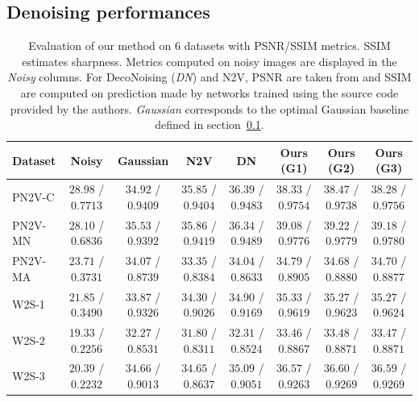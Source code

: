 \documentclass{article}
\begin{document}
\subsection{Denoising performances}
\label{sec:perf}
\begin{table}[t]
\caption{Evaluation of our method on 6 datasets with PSNR/SSIM metrics. SSIM estimates sharpness. Metrics computed on noisy images are displayed in the \textit{Noisy} columns. For DecoNoising (\textit{DN}) and N2V, PSNR are taken from \cite{goncharova2020} and SSIM are computed on prediction made by networks trained using the source code provided by the authors\protect\footnotemark. \textit{Gaussian} corresponds to the optimal Gaussian baseline defined in section~\ref{sec:perf}.}
\label{table:results}
\vskip -0.15in
\begin{center}
\begin{small}
\begin{sc}
\begin{tabular}{l@{\hskip 7.5pt}c@{\hskip 7.5pt}c@{\hskip 7.5pt}c@{\hskip 7.5pt}c@{\hskip 7.5pt}c@{\hskip 7.5pt}c@{\hskip 7.5pt}c}
\toprule
Dataset & Noisy & Gaussian & N2V & DN & Ours (G1) & Ours (G2) & Ours (G3) \\
\midrule
PN2V-C & $28.98$ / $0.7713$ & $34.92$ / $0.9409$ & $35.85$ / $0.9404$ & $36.39$ / $0.9483$ & $38.33$ / $0.9754$ & $38.47$ / $0.9738$ & $38.28$ / $0.9756$ \\
PN2V-MN & $28.10$ / $0.6836$ & $35.53$ / $0.9392$ & $35.86$ / $0.9419$ & $36.34$ / $0.9489$ & $39.08$ / $0.9776$ & $39.22$ / $0.9779$ & $39.18$ / $0.9780$ \\
PN2V-MA & $23.71$ / $0.3731$ & $34.07$ / $0.8739$ & $33.35$ / $0.8384$ & $34.04$ / $0.8633$ & $34.79$ / $0.8905$ & $34.68$ / $0.8880$ & $34.70$ / $0.8877$ \\
W2S-1 & $21.85$ / $0.3490$ & $33.87$ / $0.9326$ & $34.30$ / $0.9026$ & $34.90$ / $0.9169$ & $35.33$ / $0.9619$ & $35.27$ / $0.9623$ & $35.27$ / $0.9624$ \\
W2S-2 & $19.33$ / $0.2256$ & $32.27$ / $0.8531$ & $31.80$ / $0.8311$ & $32.31$ / $0.8524$ & $33.46$ / $0.8867$ & $33.48$ / $0.8871$ & $33.47$ / $0.8871$ \\
W2S-3 & $20.39$ / $0.2232$ & $34.66$ / $0.9013$ & $34.65$ / $0.8637$ & $35.09$ / $0.9051$ & $36.57$ / $0.9263$ & $36.60$ / $0.9269$ & $36.59$ / $0.9269$ \\
\bottomrule
\end{tabular}
\end{sc}
\end{small}
\end{center}
\vskip -0.2in
\end{table}
\end{document}
